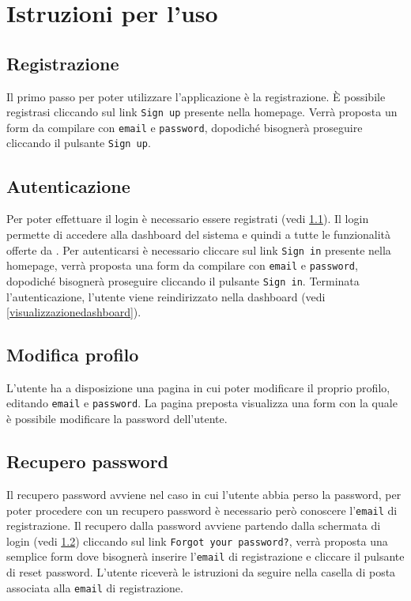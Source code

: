\section{Istruzioni per l'uso}

	\subsection{Registrazione}
	\label{registrazione}
	Il primo passo per poter utilizzare l'applicazione  è la registrazione. \`E possibile registrasi cliccando sul link \texttt{Sign up} presente nella homepage. Verrà proposta un form da compilare con \texttt{email} e \texttt{password}, dopodiché bisognerà proseguire cliccando il pulsante \texttt{Sign up}.  

	\subsection{Autenticazione}
	\label{autenticazione}
	Per poter effettuare il login è necessario essere registrati (vedi \ref{registrazione}). Il login permette di accedere alla dashboard del sistema e quindi a tutte le funzionalità offerte da . Per autenticarsi è necessario cliccare sul link \texttt{Sign in} presente nella homepage, verrà proposta una form da compilare con \texttt{email} e \texttt{password}, dopodiché bisognerà proseguire cliccando il pulsante \texttt{Sign in}. Terminata l'autenticazione, l'utente viene reindirizzato nella dashboard (vedi \ref{visualizzazionedashboard}).

	\subsection{Modifica profilo}
	\label{modificaprofilo}
	L'utente ha a disposizione una pagina in cui poter modificare il proprio profilo, editando \texttt{email} e \texttt{password}. La pagina preposta visualizza una form con la quale è possibile modificare la password dell'utente.

	\subsection{Recupero password}
	\label{recuperopassword}
	Il recupero password avviene nel caso in cui l'utente abbia perso la password, per poter procedere con un recupero password è necessario però conoscere l'\texttt{email} di registrazione. Il recupero dalla password avviene partendo dalla schermata di login (vedi \ref{autenticazione}) cliccando sul link \texttt{Forgot your password?}, verrà proposta una semplice form dove bisognerà inserire l'\texttt{email} di registrazione e cliccare il pulsante di reset password. 
	L'utente riceverà le istruzioni da seguire nella casella di posta associata alla \texttt{email} di registrazione.

